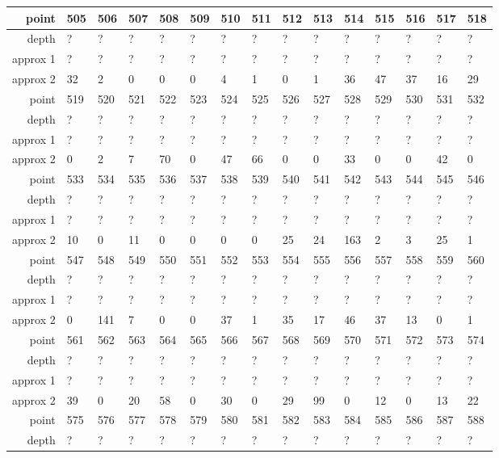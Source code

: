 \begin{center}
\begin{supertabular}{|r|l l l l l l l l l l l l l l|}
point & 505 & 506 & 507 & 508 & 509 & 510 & 511 & 512 & 513 & 514 & 515 & 516 & 517 & 518 \\
\hline
depth & ? & ? & ? & ? & ? & ? & ? & ? & ? & ? & ? & ? & ? & ? \\
approx 1 & ? & ? & ? & ? & ? & ? & ? & ? & ? & ? & ? & ? & ? & ? \\
approx 2 & 32 & 2 & 0 & 0 & 0 & 4 & 1 & 0 & 1 & 36 & 47 & 37 & 16 & 29 \\
\hline
point & 519 & 520 & 521 & 522 & 523 & 524 & 525 & 526 & 527 & 528 & 529 & 530 & 531 & 532 \\
\hline
depth & ? & ? & ? & ? & ? & ? & ? & ? & ? & ? & ? & ? & ? & ? \\
approx 1 & ? & ? & ? & ? & ? & ? & ? & ? & ? & ? & ? & ? & ? & ? \\
approx 2 & 0 & 2 & 7 & 70 & 0 & 47 & 66 & 0 & 0 & 33 & 0 & 0 & 42 & 0 \\
\hline
point & 533 & 534 & 535 & 536 & 537 & 538 & 539 & 540 & 541 & 542 & 543 & 544 & 545 & 546 \\
\hline
depth & ? & ? & ? & ? & ? & ? & ? & ? & ? & ? & ? & ? & ? & ? \\
approx 1 & ? & ? & ? & ? & ? & ? & ? & ? & ? & ? & ? & ? & ? & ? \\
approx 2 & 10 & 0 & 11 & 0 & 0 & 0 & 0 & 25 & 24 & 163 & 2 & 3 & 25 & 1 \\
\hline
point & 547 & 548 & 549 & 550 & 551 & 552 & 553 & 554 & 555 & 556 & 557 & 558 & 559 & 560 \\
\hline
depth & ? & ? & ? & ? & ? & ? & ? & ? & ? & ? & ? & ? & ? & ? \\
approx 1 & ? & ? & ? & ? & ? & ? & ? & ? & ? & ? & ? & ? & ? & ? \\
approx 2 & 0 & 141 & 7 & 0 & 0 & 37 & 1 & 35 & 17 & 46 & 37 & 13 & 0 & 1 \\
\hline
point & 561 & 562 & 563 & 564 & 565 & 566 & 567 & 568 & 569 & 570 & 571 & 572 & 573 & 574 \\
\hline
depth & ? & ? & ? & ? & ? & ? & ? & ? & ? & ? & ? & ? & ? & ? \\
approx 1 & ? & ? & ? & ? & ? & ? & ? & ? & ? & ? & ? & ? & ? & ? \\
approx 2 & 39 & 0 & 20 & 58 & 0 & 30 & 0 & 29 & 99 & 0 & 12 & 0 & 13 & 22 \\
\hline
point & 575 & 576 & 577 & 578 & 579 & 580 & 581 & 582 & 583 & 584 & 585 & 586 & 587 & 588 \\
\hline
depth & ? & ? & ? & ? & ? & ? & ? & ? & ? & ? & ? & ? & ? & ? \\

\end{supertabular}
\end{center}
